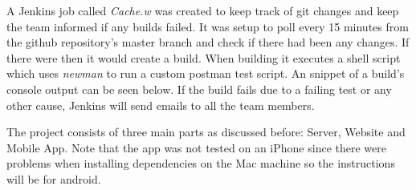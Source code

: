 \documentclass[12pt, a4paper]{report}
\begin{document}
A Jenkins job called \textit{Cache.w} was created to keep track of git changes and keep the team informed if any builds failed. It was setup to poll every 15 minutes from the github repository's master branch and check if there had been any changes. If there were then it would create a build. When building it executes a shell script which uses \textit{newman} to run a custom postman test script. An snippet of a build's console output can be seen below. If the build fails due to a failing test or any other cause, Jenkins will send emails to all the team members.
\begin{figure} [h]
\centering
{}
\end{figure}
The project consists of three main parts as discussed before: Server, Website and Mobile App. Note that the app was not tested on an iPhone since there were problems when installing dependencies on the Mac machine so the instructions will be for android.
\end{document}
